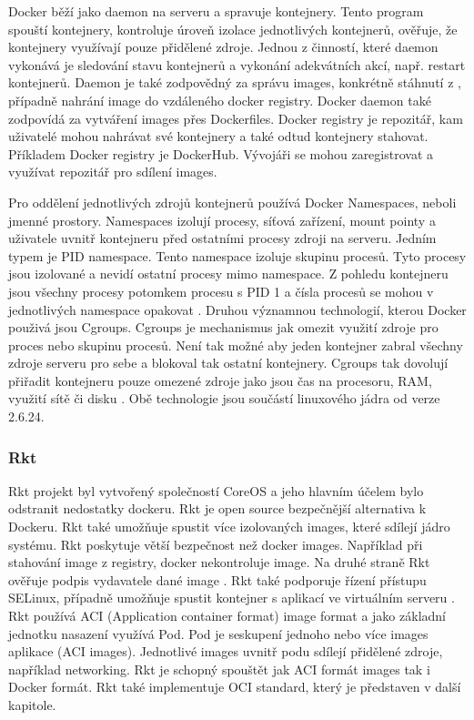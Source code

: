 Docker běží jako daemon na serveru a spravuje kontejnery. Tento program spouští kontejnery, kontroluje úroveň izolace jednotlivých kontejnerů, ověřuje, že kontejnery využívají pouze přidělené zdroje. Jednou z činností, které daemon vykonává je sledování stavu kontejnerů a vykonání adekvátních akcí, např. restart kontejnerů. Daemon je také zodpovědný za správu images, konkrétně stáhnutí z , případně nahrání image do vzdáleného docker registry. Docker daemon také zodpovídá za vytváření images přes Dockerfiles. Docker registry je repozitář, kam uživatelé mohou nahrávat své kontejnery a také odtud kontejnery stahovat. Příkladem Docker registry je DockerHub. Vývojáři se mohou zaregistrovat a využívat repozitář pro sdílení images. \par
Pro oddělení jednotlivých zdrojů kontejnerů používá Docker Namespaces, neboli jmenné prostory. Namespaces izolují procesy, síťová zařízení, mount pointy a uživatele uvnitř kontejneru před ostatními procesy zdroji na serveru. Jedním typem je PID namespace. Tento namespace izoluje skupinu procesů. Tyto procesy jsou izolované a nevidí ostatní procesy mimo namespace. Z pohledu kontejneru jsou všechny procesy potomkem procesu s PID 1 a čísla procesů se mohou v jednotlivých namespace opakovat \cite{namespaces}. Druhou významnou technologií, kterou Docker použivá jsou Cgroups. Cgroups je mechanismus jak omezit využití zdroje pro proces nebo skupinu procesů. Není tak možné aby jeden kontejner zabral všechny zdroje serveru pro sebe a blokoval tak ostatní kontejnery. Cgroups tak dovolují přiřadit kontejneru pouze omezené zdroje jako jsou čas na procesoru, RAM, využití sítě či disku \cite{cgroup}. Obě technologie jsou součástí linuxového jádra od verze 2.6.24.\par
\subsubsection{Rkt}
Rkt projekt byl vytvořený společností CoreOS a jeho hlavním účelem bylo odstranit nedostatky dockeru. Rkt je open source bezpečnější alternativa k Dockeru. Rkt také umožňuje spustit více izolovaných images, které sdílejí jádro systému. Rkt poskytuje větší bezpečnost než docker images. Například při stahování image z registry, docker nekontroluje image. Na druhé straně Rkt ověřuje podpis vydavatele dané image \cite{ROCKET}. Rkt také podporuje řízení přístupu SELinux, případně umožňuje spustit kontejner s aplikací ve virtuálním serveru \cite{selinux}. Rkt používá ACI (Application container format) image format a jako základní jednotku nasazení využívá Pod. Pod je seskupení jednoho nebo více images aplikace (ACI images). Jednotlivé images uvnitř podu sdílejí přidělené zdroje, například networking. Rkt je schopný spouštět jak ACI formát images tak i Docker formát. Rkt také implementuje OCI standard, který je představen v další kapitole.
